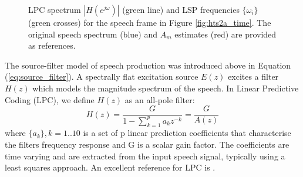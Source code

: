 \documentclass{article}
\begin{document}
{\begin{figure} [h]
\caption{LPC spectrum $|H(e^{j \omega})|$ (green line) and LSP frequencies $\{\omega_i\}$ (green crosses) for the speech frame in Figure \ref{fig:hts2a_time}. The original speech spectrum (blue) and $A_m$ estimates (red) are provided as references.}
\label{fig:hts2a_lpc_lsp}
\begin{center}

\end{center}
\end{figure}

The source-filter model of speech production was introduced above in Equation (\ref{eq:source_filter}).  A spectrally flat excitation source $E(z)$ excites a filter $H(z)$ which models the magnitude spectrum of the speech.  In Linear Predictive Coding (LPC), we define $H(z)$ as an all-pole filter:
\begin{equation}
H(z) = \frac{G}{1-\sum_{k=1}^p a_k z^{-k}} = \frac{G}{A(z)}
\end{equation}
where  $\{a_k\}, k=1..10$ is a set of p linear prediction coefficients that characterise the filters frequency response and G is a scalar gain factor.  The coefficients are time varying and are extracted from the input speech signal, typically using a least squares approach.  An excellent reference for LPC is \cite{makhoul1975linear}.

}
\end{document}
